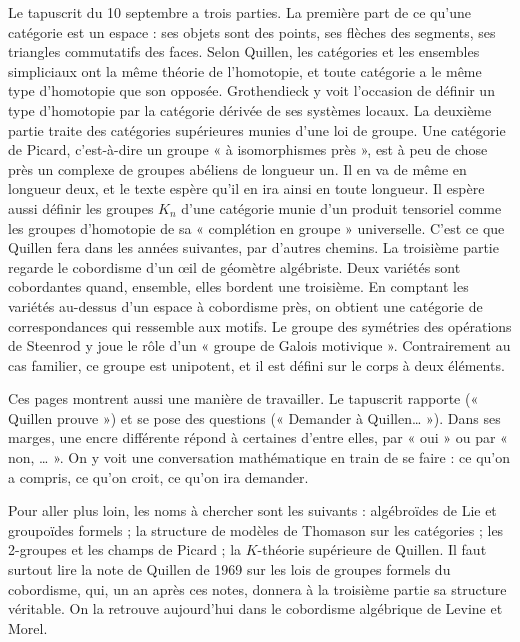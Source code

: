 \documentclass[11pt,a4paper]{article}
\begin{document}
\begin{resume}
Le tapuscrit du 10 septembre a trois parties. La première part de ce qu'une
catégorie est un espace : ses objets sont des points, ses flèches des segments,
ses triangles commutatifs des faces. Selon Quillen, les catégories et les
ensembles simpliciaux ont la même théorie de l'homotopie, et toute catégorie a
le même type d'homotopie que son opposée. Grothendieck y voit l'occasion de
définir un type d'homotopie par la catégorie dérivée de ses systèmes locaux.
La deuxième partie traite des catégories supérieures munies d'une loi de groupe.
Une catégorie de Picard, c'est-à-dire un groupe « à isomorphismes près », est
à peu de chose près un complexe de groupes abéliens de longueur un. Il en va de
même en longueur deux, et le texte espère qu'il en ira ainsi en toute longueur.
Il espère aussi définir les groupes $K_n$ d'une catégorie munie d'un produit
tensoriel comme les groupes d'homotopie de sa « complétion en groupe »
universelle. C'est ce que Quillen fera dans les années suivantes, par d'autres
chemins. La troisième partie regarde le cobordisme d'un œil de géomètre
algébriste. Deux variétés sont cobordantes quand, ensemble, elles bordent une
troisième. En comptant les variétés au-dessus d'un espace à cobordisme près, on
obtient une catégorie de correspondances qui ressemble aux motifs. Le groupe
des symétries des opérations de Steenrod y joue le rôle d'un « groupe de Galois
motivique ». Contrairement au cas familier, ce groupe est unipotent, et il est
défini sur le corps à deux éléments.

Ces pages montrent aussi une manière de travailler. Le tapuscrit rapporte
(« Quillen prouve ») et se pose des questions (« Demander à Quillen… »). Dans ses
marges, une encre différente répond à certaines d'entre elles, par « oui » ou
par « non, … ». On y voit une conversation mathématique en train de se
faire : ce qu'on a compris, ce qu'on croit, ce qu'on ira demander.

Pour aller plus loin, les noms à chercher sont les suivants : algébroïdes de
Lie et groupoïdes formels ; la structure de modèles de Thomason sur les
catégories ; les 2-groupes et les champs de Picard ; la $K$-théorie supérieure
de Quillen. Il faut surtout lire la note de Quillen de 1969 sur les lois de
groupes formels du cobordisme, qui, un an après ces notes, donnera à la
troisième partie sa structure véritable. On la retrouve aujourd'hui dans le
cobordisme algébrique de Levine et Morel.

\end{resume}
\end{document}
